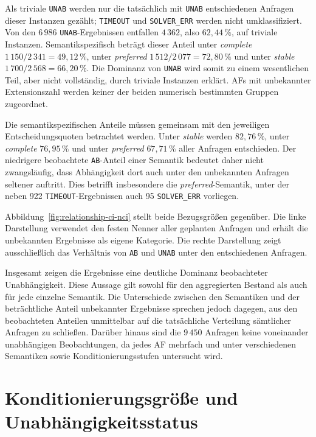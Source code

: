 Als triviale \texttt{UNAB} werden nur die tatsächlich mit \texttt{UNAB}
entschiedenen Anfragen dieser Instanzen gezählt; \texttt{TIMEOUT} und
\texttt{SOLVER\_ERR} werden nicht umklassifiziert. Von den \(6\,986\)
\texttt{UNAB}-Ergebnissen entfallen \(4\,362\), also \(62{,}44\,\%\), auf
triviale Instanzen. Semantikspezifisch beträgt dieser Anteil unter
\emph{complete} \(1\,150/2\,341=49{,}12\,\%\), unter \emph{preferred}
\(1\,512/2\,077=72{,}80\,\%\) und unter \emph{stable}
\(1\,700/2\,568=66{,}20\,\%\). Die Dominanz von \texttt{UNAB} wird somit
zu einem wesentlichen Teil, aber nicht vollständig, durch triviale Instanzen
erklärt. AFs mit unbekannter Extensionszahl werden keiner der beiden numerisch
bestimmten Gruppen zugeordnet.

Die semantikspezifischen Anteile müssen gemeinsam mit den jeweiligen
Entscheidungsquoten betrachtet werden. Unter \emph{stable} werden
\(82{,}76\,\%\), unter \emph{complete} \(76{,}95\,\%\) und unter
\emph{preferred} \(67{,}71\,\%\) aller Anfragen entschieden. Der niedrigere
beobachtete \texttt{AB}-Anteil einer Semantik bedeutet daher nicht
zwangsläufig, dass Abhängigkeit dort auch unter den unbekannten Anfragen
seltener auftritt. Dies betrifft insbesondere die \emph{preferred}-Semantik,
unter der neben 922 \texttt{TIMEOUT}-Ergebnissen auch 95
\texttt{SOLVER\_ERR} vorliegen.

Abbildung~\ref{fig:relationship-ci-nci} stellt beide Bezugsgrößen gegenüber. 
Die linke Darstellung verwendet den festen Nenner aller geplanten Anfragen 
und erhält die unbekannten Ergebnisse als eigene Kategorie. 
Die rechte Darstellung zeigt ausschließlich das Verhältnis von 
\texttt{AB} und \texttt{UNAB} unter den entschiedenen Anfragen.

Insgesamt zeigen die Ergebnisse eine deutliche Dominanz beobachteter
Unabhängigkeit. Diese Aussage gilt sowohl für den aggregierten Bestand als
auch für jede einzelne Semantik. Die Unterschiede zwischen den Semantiken und
der beträchtliche Anteil unbekannter Ergebnisse sprechen jedoch dagegen, aus
den beobachteten Anteilen unmittelbar auf die tatsächliche Verteilung
sämtlicher Anfragen zu schließen. Darüber hinaus sind die \(9\,450\) Anfragen
keine voneinander unabhängigen Beobachtungen, da jedes AF mehrfach und unter
verschiedenen Semantiken sowie Konditionierungsstufen untersucht wird.

\section{Konditionierungsgröße und Unabhängigkeitsstatus}
\label{subsec:z-ci-status}

